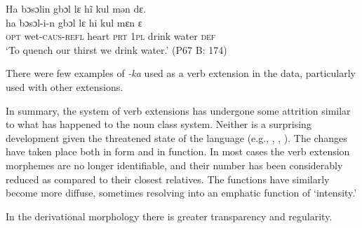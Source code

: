   \ex Ha bɔsɔlin gbɔl\footnotemark{} lɛ hĩ kul mən dɛ.\\
  \gll ha    bɔsɔl-i-n      gbɔl    lɛ    hi    kul    mɛn    ɛ\\
  \textsc{opt}  wet-\textsc{caus-refl}  heart  \textsc{prt}  1\textsc{pl}  drink    water    \textsc{def}\\
  \glt ‘To quench our thirst we drink water.' (P67 B: 174)
  \z
  \z

\noindent There were few examples of \textit{{}-ka} used as a verb extension in the data, particularly used with other extensions.

In summary, the system of verb extensions has undergone some attrition similar to what has happened to the noun class system. Neither is a surprising development given the threatened state of the language (e.g., \citealt{Childs2009}, \citealt{Craig1997},  \citealt{Dorian1978}). The changes have taken place both in form and in function. In most cases the verb extension morphemes are no longer identifiable, and their number has been considerably reduced as compared to their closest relatives. The functions have similarly become more diffuse, sometimes resolving into an emphatic function of ‘intensity.'

In the derivational morphology there is greater transparency and regularity.

